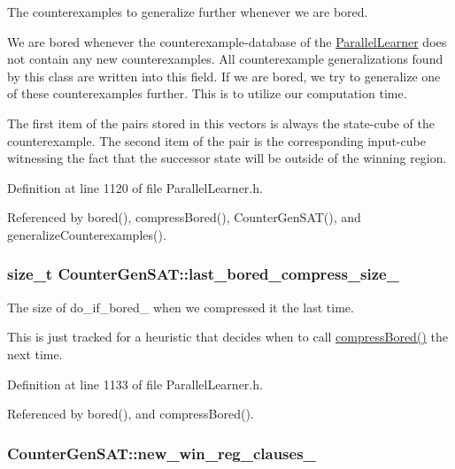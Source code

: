 The counterexamples to generalize further whenever we are bored. 

We are bored whenever the counterexample-\/database of the \hyperlink{classParallelLearner}{Parallel\-Learner} does not contain any new counterexamples. All counterexample generalizations found by this class are written into this field. If we are bored, we try to generalize one of these counterexamples further. This is to utilize our computation time.

The first item of the pairs stored in this vectors is always the state-\/cube of the counterexample. The second item of the pair is the corresponding input-\/cube witnessing the fact that the successor state will be outside of the winning region. 

Definition at line 1120 of file Parallel\-Learner.\-h.



Referenced by bored(), compress\-Bored(), Counter\-Gen\-S\-A\-T(), and generalize\-Counterexamples().

\hypertarget{classCounterGenSAT_ae3befc2cd3c74b65e055f7d29dcc9c05}{
\subsubsection[{last\-\_\-bored\-\_\-compress\-\_\-size\-\_\-}]{\setlength{\rightskip}{0pt plus 5cm}size\-\_\-t Counter\-Gen\-S\-A\-T\-::last\-\_\-bored\-\_\-compress\-\_\-size\-\_\-\hspace{0.3cm}{\ttfamily [protected]}}}\label{classCounterGenSAT_ae3befc2cd3c74b65e055f7d29dcc9c05}


The size of do\-\_\-if\-\_\-bored\-\_\- when we compressed it the last time. 

This is just tracked for a heuristic that decides when to call \hyperlink{classCounterGenSAT_ae696c35988d55e29d5a54b3c71547c12}{compress\-Bored()} the next time. 

Definition at line 1133 of file Parallel\-Learner.\-h.



Referenced by bored(), and compress\-Bored().

\hypertarget{classCounterGenSAT_a5a379bda175a32e3d4ccc0771fde024d}{
\subsubsection[{new\-\_\-win\-\_\-reg\-\_\-clauses\-\_\-}]{ Counter\-Gen\-S\-A\-T\-::new\-\_\-win\-\_\-reg\-\_\-clauses\-\_\-\hspace{0.3cm}{\ttfamily [protected]}}}\label{classCounterGenSAT_a5a379bda175a32e3d4ccc0771fde024d}


